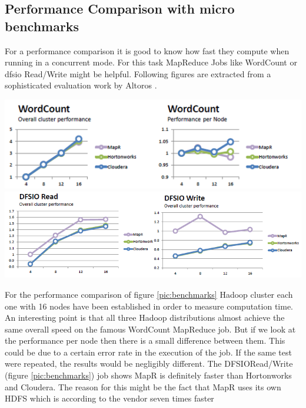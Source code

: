 \subsection{Performance Comparison with micro benchmarks}
For a performance comparison it is good to know how fast they compute when running in a
concurrent mode. For this task MapReduce Jobs like WordCount or \ac{dfsio} Read/Write might be helpful. Following figures are extracted from a sophisticated evaluation work by Altoros \citep{altoros}.
\begin{center}
\includegraphics[width=1.0\textwidth]{img/bench1}
\vspace{0.1cm}
\includegraphics[width=1.0\textwidth]{img/bench2}
\label{pic:benchmarks}
\end{center}
For the performance comparison of figure \ref{pic:benchmarks} Hadoop cluster each one with 16 nodes have been established in order to measure computation time. An interesting point is that all three Hadoop distributions almost achieve the same overall speed on the famous WordCount MapReduce job. But if we look at the performance per node then there is a small difference between them. This could be due to a certain error rate in the execution of the job. If the same test were repeated, the results would be negligibly different. The DFSIORead/Write (figure \ref{pic:benchmarks}) job shows MapR is definitely faster than Hortonworks and Cloudera. The reason for
this might be the fact that MapR uses its own HDFS which is according to the vendor seven times faster
